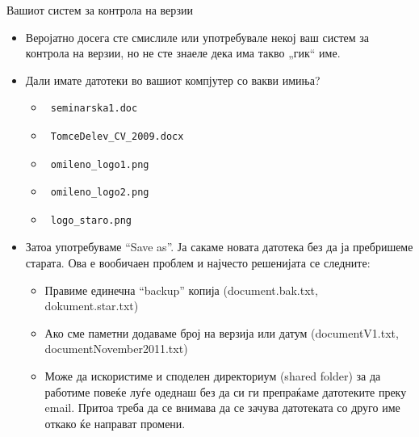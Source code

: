 \begin{frame}[fragile,shrink=10]{Вашиот систем за контрола на верзии}
\begin{itemize}
\item Веројатно досега сте смислиле или употребувале некој ваш систем за
контрола на верзии, но не сте знаеле дека има такво „гик“ име.
\pause
\item Дали имате датотеки во вашиот компјутер со вакви имиња?
    \begin{itemize}
    \item \begin{verbatim} seminarska1.doc \end{verbatim}
    \item \begin{verbatim} TomceDelev_CV_2009.docx \end{verbatim}
    \item \begin{verbatim} omileno_logo1.png \end{verbatim}
    \item \begin{verbatim} omileno_logo2.png \end{verbatim}
    \item \begin{verbatim} logo_staro.png \end{verbatim}
    \end{itemize}
\pause
\item Затоа употребуваме ``Save as''. Ја сакаме новата датотека без да ја
пребришеме старата. Ова е вообичаен проблем и најчесто решенијата се следните:
    \begin{itemize}
    \item Правиме единечна ``backup'' копија (document.bak.txt, dokument.star.txt)
    \item Ако сме паметни додаваме број на верзија или датум (documentV1.txt,
    documentNovember2011.txt)
    \item Може да искористиме и споделен директориум (shared folder) за да
    работиме повеќе луѓе одеднаш без да си ги препраќаме датотеките  преку
    email. Притоа треба да се внимава да се зачува датотеката со друго име
    откако ќе направат промени.
    \end{itemize}
\end{itemize}
\end{frame}    
    
